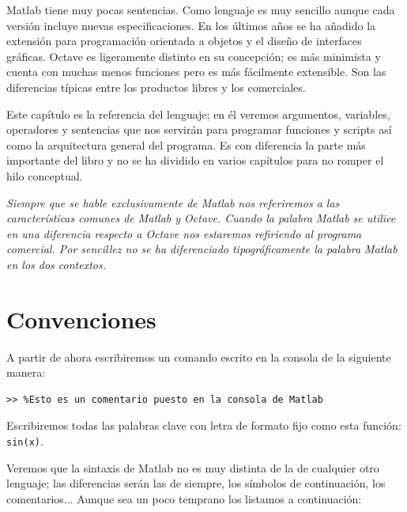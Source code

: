 Matlab tiene muy pocas sentencias. Como lenguaje es muy sencillo
aunque cada versión incluye nuevas especificaciones. En los últimos
años se ha añadido la extensión para programación orientada a objetos
y el diseño de interfaces gráficas. Octave es ligeramente distinto en
su concepción; es más minimista y cuenta con muchas menos funciones
pero es más fácilmente extensible. Son las diferencias típicas entre
los productos libres y los comerciales.

Este capítulo es la referencia del lenguaje; en él veremos argumentos,
variables, operadores y sentencias que nos servirán para programar
funciones y scripts así como la arquitectura general del programa.  Es
con diferencia la parte más importante del libro y no se ha dividido
en varios capítulos para no romper el hilo conceptual.

\emph{Siempre que se hable exclusivamente de Matlab nos referiremos a
  las características comunes de Matlab y Octave. Cuando la palabra
  Matlab se utilice en una diferencia respecto a Octave nos estaremos
  refiriendo al programa comercial. Por sencillez no se ha
  diferenciado tipográficamente la palabra Matlab en los dos
  contextos.}


\section{Convenciones}

A partir de ahora escribiremos un comando escrito en la consola de la
siguiente manera:

\begin{lstlisting}
>> %Esto es un comentario puesto en la consola de Matlab
\end{lstlisting}

Escribiremos todas las palabras clave con letra de formato fijo como
esta función: \texttt{sin(x)}.

Veremos que la sintaxis de Matlab no es muy distinta de la de
cualquier otro lenguaje; las diferencias serán las de siempre, los
símbolos de continuación, los comentarios... Aunque sea un poco
temprano los listamos a continuación:


